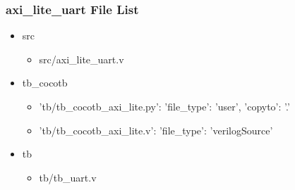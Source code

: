 \subsubsection{axi\_lite\_uart File List}
\begin{itemize}
\item src
	\begin{itemize}
	\item src/axi\_lite\_uart.v
	\end{itemize}
\item tb\_cocotb
	\begin{itemize}
	\item {'tb/tb\_cocotb\_axi\_lite.py': {'file\_type': 'user', 'copyto': '.'}}
	\item {'tb/tb\_cocotb\_axi\_lite.v': {'file\_type': 'verilogSource'}}
	\end{itemize}
\item tb
	\begin{itemize}
	\item tb/tb\_uart.v
	\end{itemize}
\end{itemize}
